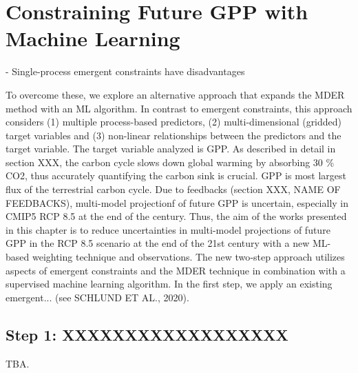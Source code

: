 


\chapter{Constraining Future \acl{GPP} with Machine Learning}
\label{ch:06:paper_gpp}

- Single-process emergent constraints have disadvantages

To overcome these, we explore an alternative approach that expands the MDER
method with an ML algorithm. In contrast to emergent constraints, this approach
considers (1) multiple process-based predictors, (2) multi-dimensional
(gridded) target variables and (3) non-linear relationships between the
predictors and the target variable. The target variable analyzed is GPP. As
described in detail in section XXX, the carbon cycle slows down global warming
by absorbing 30 \% CO2, thus accurately quantifying the carbon sink is crucial.
GPP is most largest flux of the terrestrial carbon cycle. Due to feedbacks
(section XXX, NAME OF FEEDBACKS), multi-model projectionf of future GPP is
uncertain, especially in CMIP5 RCP 8.5 at the end of the century. Thus, the aim
of the works presented in this chapter is to reduce uncertainties in
multi-model projections of future GPP in the RCP 8.5 scenario at the end of the
21st century with a new ML-based weighting technique and observations. The new
two‐step approach utilizes aspects of emergent constraints and the MDER
technique in combination with a supervised machine learning algorithm. In the
first step, we apply an existing emergent... (see SCHLUND ET AL., 2020).


\section{Step 1: XXXXXXXXXXXXXXXXXX}
\label{sec:06:step_1}

TBA.
